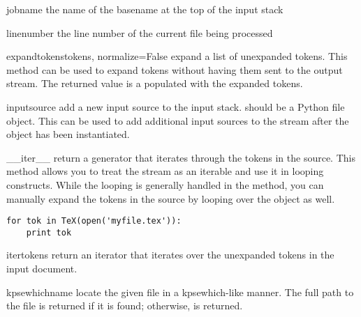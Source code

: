 \begin{memberdesc}[TeX]{jobname}
the name of the basename at the top of the input stack
\end{memberdesc}

\begin{memberdesc}[TeX]{linenumber}
the line number of the current file being processed 
\end{memberdesc}


\begin{methoddesc}[TeX]{expandtokens}{tokens, normalize=False}
expand a list of unexpanded tokens.  This method can be used to expand
tokens without having them sent to the output stream.  The returned value
is a  populated with the expanded tokens.
\end{methoddesc}

\begin{methoddesc}[TeX]{input}{source}
add a new input source to the input stack.   should be
a Python file object.  This can be used to add additional input sources
to the stream after the  object has been instantiated.
\end{methoddesc}

\begin{methoddesc}[TeX]{__iter__}{}
return a generator that iterates through the tokens in the source.  
This method allows you to treat the  stream as an iterable
and use it in looping constructs.  While the looping is generally
handled in the  method, you can manually expand the
tokens in the source by looping over the  object as well.
\begin{verbatim}
for tok in TeX(open('myfile.tex')):
    print tok
\end{verbatim}
\end{methoddesc}

\begin{methoddesc}[TeX]{itertokens}{}
return an iterator that iterates over the unexpanded tokens in the 
input document.
\end{methoddesc}

\begin{methoddesc}[TeX]{kpsewhich}{name}
locate the given file in a kpsewhich-like manner.  The full path to the
file is returned if it is found; otherwise,  is returned.
\end{methoddesc}

